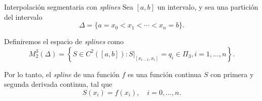 \begin{frame}{Interpolación segmentaria con \textit{splines}}
    Sea $[a, b]$ un intervalo, y sea una partición del intervalo
    \[\Delta = \{a = x_0 < x_1 < \cdots < x_n = b\}.\]
    
    Definiremos el espacio de \textit{splines} como
    \[
        M_2^3(\Delta)
        = \left\{S \in C^2([a, b]) : S|_{[x_{i-1}, x_ i]}
        = q_i \in \Pi_3, i = 1,\dots, n\right\}.
    \]

    Por lo tanto, el \textit{spline} de una función $f$ es una función
    continua $S$ con primera y segunda derivada continua, tal que
    \[
        S(x_i) = f(x_i), \quad i = 0, \dots, n.
    \]
\end{frame}
